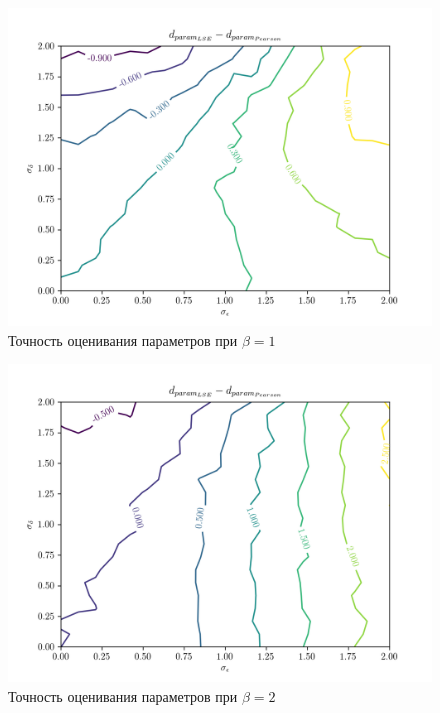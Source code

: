 \begin{figure}[h]
  \centering
  \includegraphics[width=150mm]{fig/linear/param/beta-1_param.png}
  \caption{Точность оценивания параметров при \( \beta = 1\)}
\end{figure}

\begin{figure}[h]
  \centering
  \includegraphics[width=150mm]{fig/linear/param/beta-2_param.png}
  \caption{Точность оценивания параметров при \( \beta = 2 \)}
\end{figure}

